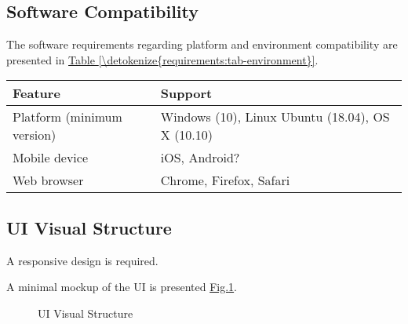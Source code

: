 \documentclass[letterpaper,10pt, openany,english]{sphinxmanual}
\begin{document}
\subsection{Software Compatibility}
\label{\detokenize{requirements:software-compatibility}}
The software requirements regarding platform and environment compatibility are presented in \hyperref[\detokenize{requirements:tab-environment}]{Table \ref{\detokenize{requirements:tab-environment}}}.


\begin{savenotes}\sphinxattablestart
\centering
{}
\sphinxthecaptionisattop
{}\label{\detokenize{requirements:id17}}\label{\detokenize{requirements:tab-environment}}
\sphinxaftertopcaption
\begin{tabulary}{\linewidth}[t]{|T|T|}
\hline
\sphinxstyletheadfamily 
Feature
&\sphinxstyletheadfamily 
Support
\\
\hline
Platform (minimum version)
&
Windows (10), Linux Ubuntu (18.04), OS X (10.10)
\\
\hline
Mobile device
&
iOS, Android?
\\
\hline
Web browser
&
Chrome, Firefox, Safari
\\
\hline
\end{tabulary}
\par
\sphinxattableend\end{savenotes}


\subsection{UI Visual Structure}
\label{\detokenize{requirements:ui-visual-structure}}
A responsive design is required.

A minimal mockup of the UI is presented \hyperref[\detokenize{requirements:screen-mockup}]{Fig.\@ \ref{\detokenize{requirements:screen-mockup}}}.

\begin{figure}[htbp]
\centering
\capstart

\noindent{}
\caption{UI Visual Structure}\label{\detokenize{requirements:screen-mockup}}\end{figure}
\end{document}
